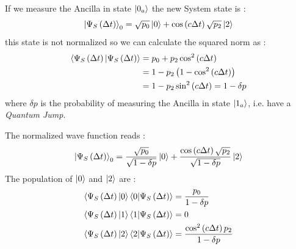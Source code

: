 \documentclass[a4paper,12pt]{article}
\begin{document}
If we measure the Ancilla in state $ \ket{0_{a}} $ the new System state is :
\begin{equation}
	\ket{\Psi_{S} \left( \Delta t \right)}_{0} = \sqrt{p_{0}} \ket{0} + \cos \left( c \Delta t \right) \sqrt{p_{2}} \ket{2} 
\end{equation}
this state is not normalized so we can calculate the squared norm as :
\begin{align}
	\braket{\Psi_{S} \left( \Delta t \right) | \Psi_{S} \left( \Delta t \right)} &= p_{0} + p_{2} \cos^{2} \left( c \Delta t \right)  \notag \\
	&= 1 - p_{2} \left( 1 - \cos^{2} \left( c \Delta t \right) \right) \notag \\
	&= 1 - p_{2} \sin^{2} \left( c \Delta t \right) =  1 - \delta p
\end{align}
where $ \delta p $ is the probability of measuring the Ancilla in state $ \ket{1_{a}} $, i.e. have a \textit{Quantum Jump}.

The normalized wave function reads : 
\begin{equation}
	\ket{\Psi_{S} \left( \Delta t \right)}_{0} = \frac{\sqrt{p_{0}}}{\sqrt{1 - \delta p}} \ket{0} + \frac{\cos \left( c \Delta t \right) \sqrt{p_{2}}}{\sqrt{1 - \delta p}} \ket{2}
\end{equation}
The population of $ \ket{0} $ and $ \ket{2} $ are : 
\begin{align}
	\braket{\Psi_{S} \left( \Delta t \right) | 0 } \braket{0 | \Psi_{S} \left( \Delta t \right) } &= \frac{p_{0}}{1 - \delta p} \\ 
	\braket{\Psi_{S} \left( \Delta t \right) | 1 } \braket{1 | \Psi_{S} \left( \Delta t \right) } &= 0 \\
	\braket{\Psi_{S} \left( \Delta t \right) | 2 } \braket{ 2 | \Psi_{S} \left( \Delta t \right) } &= \frac{ \cos^{2} \left( c \Delta t \right) p_{2}}{1 - \delta p}
\end{align}
\end{document}
